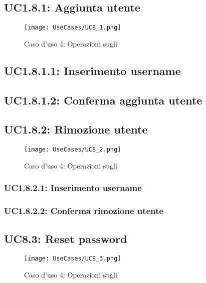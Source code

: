\documentclass{scalatekids-article}
\begin{document}
\subsection{UC1.8.1: Aggiunta utente}

\begin{figure}[H]
  \begin{center}
    \texttt{[image: UseCases/UC8\_1.png]}
    \caption*{Caso d'uso 4: Operazioni sugli }
  \end{center}
\end{figure}

\subsection{UC1.8.1.1: Inserimento username}

\subsection{UC1.8.1.2: Conferma aggiunta utente}

\subsection{UC1.8.2: Rimozione utente}

\begin{figure}[H]
  \begin{center}
    \texttt{[image: UseCases/UC8\_2.png]}
    \caption*{Caso d'uso 4: Operazioni sugli }
  \end{center}
\end{figure}

\subsubsection{UC1.8.2.1: Inserimento username}

\subsubsection{UC1.8.2.2: Conferma rimozione utente}

\subsection{UC8.3: Reset password}

\begin{figure}[H]
  \begin{center}
    \texttt{[image: UseCases/UC8\_3.png]}
    \caption*{Caso d'uso 4: Operazioni sugli }
  \end{center}
\end{figure}
\end{document}
